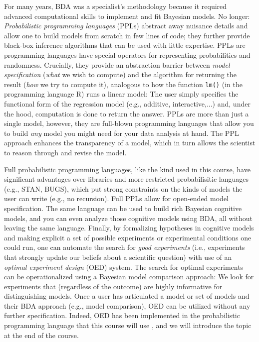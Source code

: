 \documentclass[10pt,letterpaper]{article}
\newcommand{\ndg}[1]{\textcolor{green}{[ndg: #1]}}
\begin{document}
For many years, BDA was a specialist's methodology because it required advanced computational skills to implement and fit Bayesian models.
No longer: \emph{Probabilistic programming languages} (PPLs) abstract away nuisance details and allow one to build models from scratch in few lines of code; they further provide black-box inference algorithms that can be used with little expertise.
PPLs are programming languages have special operators for representing probabilities and randomness. 
Crucially, they provide an abstraction barrier between \emph{model specification} (\emph{what} we wish to compute) and the algorithm for returning the result (\emph{how} we try to compute it), analogous to how the function \lstinline{lm()} (in the programming language R) runs a linear model: The user simply specifies the functional form of the regression model (e.g., additive, interactive,...) and, under the hood, computation is done to return the answer.
PPLs are more than just a single model, however, they are full-blown programming languages that allow you to build \emph{any} model you might need for your data analysis at hand.
The PPL approach enhances the transparency of a model, which in turn allows the scientist to reason through and revise the model. 



Full probabilistic programming languages, like the kind used in this course, have significant advantages over libraries and more restricted probabilisitic languages (e.g., STAN, BUGS), which put strong constraints on the kinds of models the user can write (e.g., no recursion). 
Full PPLs allow for open-ended model specification.
The same language can be used to build rich Bayesian cognitive models, and you can even analyze those cognitive models using BDA, all without leaving the same language.
Finally, by formalizing hypotheses in cognitive models and making explicit a set of possible experiments or experimental conditions one could run, one can automate the search for \emph{good experiments} (i.e., experiments that strongly update our beliefs about a scientific question) with use of an \emph{optimal experiment design} (OED) system.
The search for optimal experiments can be operationalized using a Bayesian model comparison approach: We look for experiments that (regardless of the outcome) are highly informative for distinguishing models. 
Once a user has articulated a model or set of models and their BDA approach (e.g., model comparison), OED can be utilized without any further specification. 
Indeed, OED has been implemented in the probabilistic programming language that this course will use \cite{ouyangArxivOED}, and we will introduce the topic at the end of the course.
\end{document}
